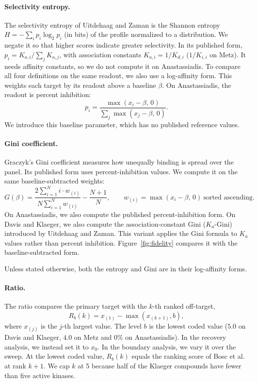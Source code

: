 \paragraph{Selectivity entropy.} The selectivity entropy of Uitdehaag and
Zaman\cite{Uitdehaag2011} is the Shannon entropy
$H = -\sum_i p_i \log_2 p_i$ (in bits) of the profile normalized to a
distribution. We negate it so that higher scores indicate greater
selectivity. In its published form, $p_i = K_{a,i} / \sum_j K_{a,j}$, with
association constants $K_{a,i} = 1/K_{d,i}$ ($1/K_{i,i}$ on Metz). It needs
affinity constants, so we do not compute it on Anastassiadis. To compare all
four definitions on the same readout, we also use a log-affinity form. This
weights each target by its readout above a baseline $\beta$. On Anastassiadis,
the readout is percent inhibition:
\begin{equation}
  p_i = \frac{\max(x_i - \beta,\, 0)}{\sum_j \max(x_j - \beta,\, 0)}.
\end{equation}
We introduce this baseline parameter, which has no published reference values.

\paragraph{Gini coefficient.} Graczyk's Gini coefficient\cite{Graczyk2010} measures how unequally
binding is spread over the panel. Its published form uses percent-inhibition
values. We compute it on the same baseline-subtracted weights:
\begin{equation}
  G(\beta) = \frac{2\sum_{i=1}^{N} i \cdot w_{(i)}}{N \sum_{i=1}^{N} w_{(i)}} - \frac{N+1}{N},
  \qquad w_{(i)} = \max(x_i - \beta,\, 0)\ \text{sorted ascending}.
\end{equation}
On Anastassiadis, we also compute the published percent-inhibition form.
On Davis and Klaeger, we also compute the association-constant Gini
($K_a$-Gini) introduced by Uitdehaag and Zaman\cite{Uitdehaag2011}.
This variant applies the Gini formula to $K_a$ values rather than percent
inhibition. Figure~\ref{fig:fidelity} compares it with the baseline-subtracted
form.

Unless stated otherwise, both the
entropy and Gini are in their log-affinity forms.

\paragraph{Ratio.} The ratio compares the primary target with the $k$-th
ranked off-target,
\begin{equation}
  R_b(k) = x_{(1)} - \max(x_{(k+1)}, b),
\end{equation}
where $x_{(j)}$ is the $j$-th largest value. The level $b$ is the lowest coded
value ($5.0$ on Davis and Klaeger, $4.0$ on Metz and $0\%$ on Anastassiadis).
In the recovery analysis, we instead set it to $x_0$. In the boundary analysis,
we vary it over the sweep. At the lowest coded value, $R_b(k)$ equals the
ranking score of Bosc et al.\cite{Bosc2017} at rank $k + 1$. We cap $k$ at 5
because half of the Klaeger compounds have fewer than five active kinases.

